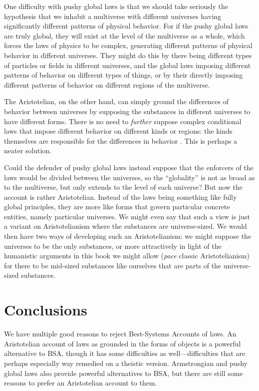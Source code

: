 One difficulty with pushy global laws is that we should take seriously
the hypothesis that we inhabit a multiverse with different universes having significantly different patterns of physical behavior. 
For if the pushy global laws are truly global, they will exist at the level of the multiverse as a whole, which forces the
laws of physics to be complex, generating different patterns of physical behavior in different universes. They might do this by there being different types of particles or fields in different universes, and the global laws imposing 
different patterns of behavior on 
different types of things, or by their directly imposing different patterns of behavior on different regions of the multiverse. 

The Aristotelian, on the other hand, can simply ground the differences of behavior between universes by supposing 
the substances in different universes to have different forms. There is no need to \textit{further} suppose 
complex conditional laws that impose different behavior on different kinds or regions: the kinds themselves
are responsible for the differences in behavior	. This is perhaps a neater solution. 

Could the defender of pushy global laws instead suppose that the enforcers of the laws would be divided between the 
universes, so the ``globality'' is not as broad as to the multiverse, but only extends to the level of each universe?
But now the account is rather Aristotelian. Instead of the laws being something like fully global principles, they are 
more like forms that govern particular concrete entities, namely particular universes. We might even say that such a 
view is just a variant on Aristotelianism where the substances are universe-sized. We would then have two ways of 
developing such an Aristotelianism: we might suppose the universes to be the only substances, or more attractively 
in light of the humanistic arguments in this book we might allow (\textit{pace} classic Aristotelianism) for there to 
be mid-sized substances like ourselves that are parts of the universe-sized substances. 

\section{Conclusions}
We have multiple good reasons to reject Best-Systems Accounts of laws. An Aristotelian account of laws as grounded
in the forms of objects is a powerful alternative to BSA, though it has some difficulties as well---difficulties
that are perhaps especially way remedied on a theistic version. Armstrongian and pushy global laws also provide
powerful alternatives to BSA, but there are still some reasons to prefer an Aristotelian account to them.

\chaptertail
